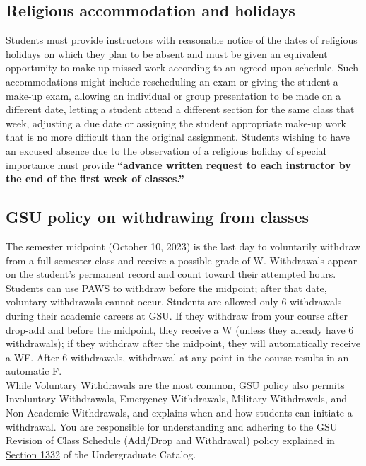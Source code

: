 \documentclass{article}
\begin{document}
\subsection{Religious accommodation and holidays}
Students must provide instructors with reasonable notice of the dates of religious holidays on which they plan to be absent and must be given an equivalent opportunity to make up missed work according to an agreed-upon schedule. Such accommodations might include rescheduling an exam or giving the student a make-up exam, allowing an individual or group presentation to be made on a different date, letting a student attend a different section for the same class that week, adjusting a due date or assigning the student appropriate make-up work that is no more difficult than the original assignment. Students wishing to have an excused absence due to the observation of a religious holiday of special importance must provide \textbf{“advance written request to each instructor by the end of the first week of classes.”}

\subsection{GSU policy on withdrawing from classes}
The semester midpoint (October 10, 2023) is the last day to voluntarily withdraw from a full semester class and receive a possible grade of W.  Withdrawals appear on the student’s permanent record and count toward their attempted hours.  
\\
Students can use PAWS to withdraw before the midpoint; after that date, voluntary withdrawals cannot occur.  Students are allowed only 6 withdrawals during their academic careers at GSU. If they withdraw from your course after drop-add and before the midpoint, they receive a W (unless they already have 6 withdrawals); if they withdraw after the midpoint, they will automatically receive a WF.   After 6 withdrawals, withdrawal at any point in the course results in an automatic F. 
\\
While Voluntary Withdrawals are the most common, GSU policy also permits Involuntary Withdrawals, Emergency Withdrawals, Military Withdrawals, and Non-Academic Withdrawals, and explains when and how students can initiate a withdrawal.   You are responsible for understanding and adhering to the GSU Revision of Class Schedule (Add/Drop and Withdrawal) policy explained in \href{https://catalogs.gsu.edu/content.php?catoid=13&navoid=1563}{Section 1332} of the Undergraduate Catalog.  
\end{document}
